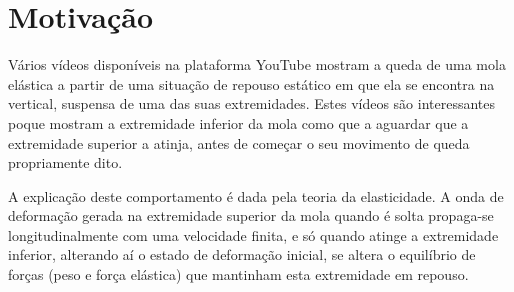 \documentclass{article}
\begin{document}
\section*{Motivação}
Vários vídeos disponíveis na plataforma YouTube mostram a queda de uma mola
elástica a partir de uma situação de repouso estático em que ela se encontra na
vertical, suspensa de uma das suas extremidades. Estes vídeos são interessantes
poque mostram a extremidade inferior da mola como que a aguardar que a
extremidade superior a atinja, antes de começar o seu movimento de queda
propriamente dito.

A explicação deste comportamento é dada pela teoria da elasticidade. A onda de
deformação gerada na extremidade superior da mola quando é solta propaga-se
longitudinalmente com uma velocidade finita, e só quando atinge a extremidade
inferior, alterando aí o estado de deformação inicial, se altera o equilíbrio de
forças (peso e força elástica) que mantinham esta extremidade em repouso. 
\end{document}
